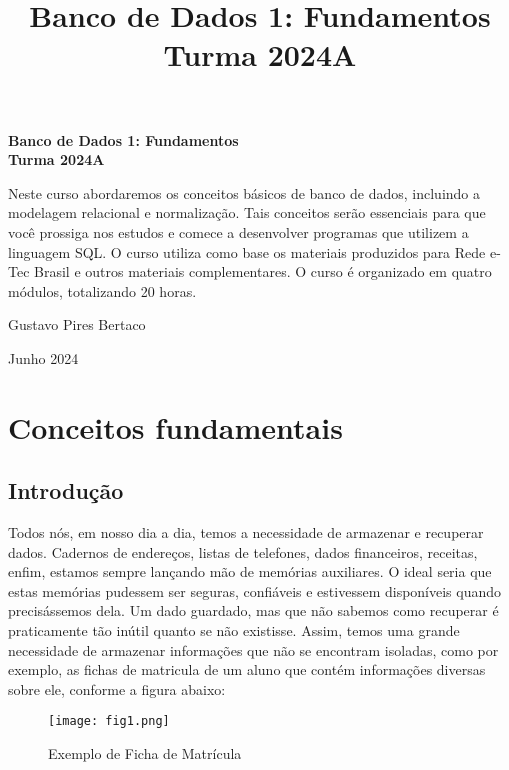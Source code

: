 \documentclass{article}
\title{\textbf{Banco de Dados 1: Fundamentos} \\ Turma 2024A}
\author{}
\date{}
\begin{document}
\begin{titlepage}
    \centering
    \vspace*{4cm}
    {\huge\bfseries Banco de Dados 1: Fundamentos \\ Turma 2024A\par}
    \vspace{2cm}
    \begin{tcolorbox}[colback=blue!5!white, colframe=blue!75!black, title=Descrição do Curso]
        \small Neste curso abordaremos os conceitos básicos de banco de dados, incluindo a modelagem relacional e normalização. Tais conceitos serão essenciais para que você prossiga nos estudos e comece a desenvolver programas que utilizem a linguagem SQL. O curso utiliza como base os materiais produzidos para Rede e-Tec Brasil e outros materiais complementares. O curso é organizado em quatro módulos, totalizando 20 horas.
    \end{tcolorbox}
    \vfill
    {\Large Gustavo Pires Bertaco\par}
    {\large Junho 2024\par}
\end{titlepage}

\newpage

\renewcommand{\contentsname}{Sumário}
\tableofcontents

\newpage

\section{Conceitos fundamentais}
\subsection{Introdução}
Todos nós, em nosso dia a dia, temos a necessidade de armazenar e recuperar dados. Cadernos de endereços, listas de telefones, dados financeiros, receitas, enfim, estamos sempre lançando mão de memórias auxiliares. O ideal seria que estas memórias pudessem ser seguras, confiáveis e estivessem disponíveis quando precisássemos dela. Um dado guardado, mas que não sabemos como recuperar é praticamente tão inútil quanto se não existisse. Assim, temos uma grande necessidade de armazenar informações que não se encontram isoladas, como por exemplo, as fichas de matricula de um aluno que contém informações diversas sobre ele, conforme a figura abaixo:

\begin{figure}[h]
    \centering
    \texttt{[image: fig1.png]}
    \caption{Exemplo de Ficha de Matrícula}
    \label{fig:fig1}
\end{figure}
\end{document}
